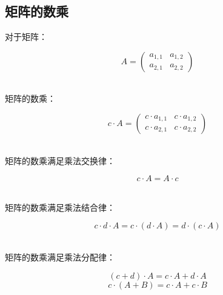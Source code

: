 \documentclass[UTF8]{ctexart}
\begin{document}
\newpage

\subsection{矩阵的数乘}
    对于矩阵：
    \begin{large}
    \begin{equation*}
        A=
        \begin{pmatrix}
            a_{1,1}&a_{1,2}\\
            a_{2,1}&a_{2,2}
        \end{pmatrix}
    \end{equation*}
    \end{large}\\
    矩阵的数乘：
    \begin{large}
    \begin{equation*}
        c\cdot A=
        \begin{pmatrix}
            c\cdot a_{1,1}&c\cdot a_{1,2}\\
            c\cdot a_{2,1}&c\cdot a_{2,2}
        \end{pmatrix}
    \end{equation*}
    \end{large}\\
    矩阵的数乘满足乘法交换律：
    \begin{large}
    \begin{equation*}
        c\cdot A=A\cdot c
    \end{equation*}
    \end{large}\\
    矩阵的数乘满足乘法结合律：
    \begin{large}
    \begin{equation*}
        c\cdot d \cdot A=c\cdot (d\cdot A)=d\cdot (c\cdot A)
    \end{equation*}
    \end{large}\\
    矩阵的数乘满足乘法分配律：
    \begin{large}
    \begin{equation*}
        (c+d)\cdot A=c\cdot A+d\cdot A
    \end{equation*}
    \begin{equation*}
        c\cdot(A+B)=c\cdot A+c\cdot B    
    \end{equation*}
    \end{large}

\newpage
\end{document}
